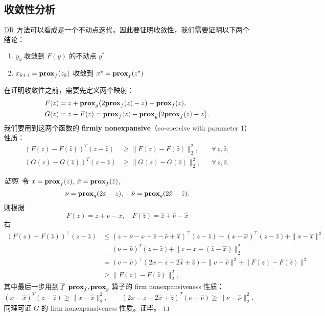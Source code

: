 \subsection{收敛性分析}

DR 方法可以看成是一个不动点迭代，因此要证明收敛性，我们需要证明以下两个结论：
\begin{enumerate}
	\item $y_k$ 收敛到 $F(y)$ 的不动点 $y^*$
	\item $x_{k+1} = {\rm \bf prox}_{f}(z_k)$ 收敛到 $x^* = {\rm \bf prox}_{f}(z^*)$
\end{enumerate}

在证明收敛性之前，需要先定义两个映射：
\[
\begin{aligned}
	F(z) &= z + {\rm \bf prox}_g\bigl(2{\rm \bf prox}_f(z) - z\bigr) - {\rm \bf prox}_f(z),\\
	G(z) &= z - F(z)
	= {\rm \bf prox}_f(z) - {\rm \bf prox}_g\bigl(2{\rm \bf prox}_f(z) - z\bigr).
\end{aligned}
\]
我们要用到这两个函数的 {\bf firmly nonexpansive}（co-coercive with parameter 1）性质：
\[
\begin{aligned}
	(F(z) - F(\hat z))^T (z - \hat z) &\ge \|F(z) - F(\hat z)\|_2^2,
	&&\forall\,z,\hat z,\\
	(G(z) - G(\hat z))^T (z - \hat z) &\ge \|G(z) - G(\hat z)\|_2^2,
	&&\forall\,z,\hat z.
\end{aligned}
\]

\begin{proof}[证明]
	令 $x = {\rm \bf prox}_f(z)$, $\hat x = {\rm \bf prox}_f(\hat z)$,  
	\[
	\nu = {\rm \bf prox}_g(2x - z),\quad \hat\nu = {\rm \bf prox}_g(2\hat x - \hat z).
	\]
	则根据
	\[
	F(z) = z + \nu - x,\quad F(\hat z) = \hat z + \hat\nu - \hat x
	\]
	有
	\[
	\begin{aligned}
		(F(z) - F(\hat z))^\top(z - \hat z)
		&\leq (z + \nu - x - \hat z - \hat\nu + \hat x)^\top(z - \hat z)  -(x - \hat x)^\top(z-\hat z) +\|x-\hat x\|^2\\
		&= (\nu - \hat\nu)^T(z - \hat z) + \|z - x - (\hat z - \hat x)\|_2^2\\
		&=(v-\hat v)^\top(2x-z-2\hat x+\hat z) - \|v-\hat v\|^2 +\|F(z)-F(\hat z)\|^2 \\
		&\ge \|F(z) - F(\hat z)\|_2^2,
	\end{aligned}
	\]
	其中最后一步用到了 ${\rm \bf prox}_f, {\rm \bf prox}_g$ 算子的 firm nonexpansiveness 性质：
	\[
	(x - \hat x)^T(z - \hat z)\ge \|x - \hat x\|_2^2,\qquad
	(2x - z - 2\hat x + \hat z)^T(\nu - \hat\nu)\ge \|\nu - \hat\nu\|_2^2.
	\]
	同理可证 $G$ 的 firm nonexpansiveness 性质。证毕。
\end{proof}

